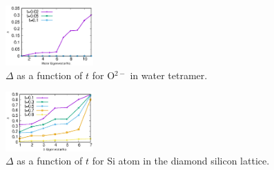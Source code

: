 \documentclass[aps,prl,twocolumn,reprint,amsmath,amssymb]{revtex4-1}
\begin{document}
\begin{figure}
\centering
\includegraphics[width=0.3\textwidth]{t_water_residue}
\caption{$\Delta$ as a function of $t$ for O$^{2-}$ in water tetramer.}
\label{sfig:t_delta_water}
\end{figure}

\begin{figure}
\centering
\includegraphics[width=0.3\textwidth]{t_si_residue}
\caption{$\Delta$ as a function of $t$ for Si atom in the diamond silicon lattice.}
\label{sfig:t_delta_si}
\end{figure}




%
\end{document}
